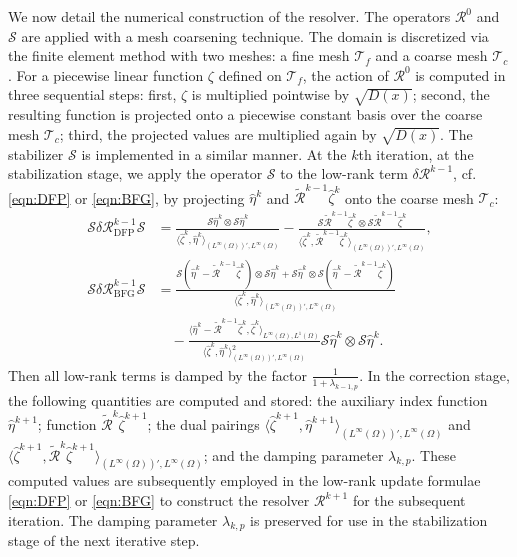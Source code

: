 \documentclass[onefignum,onetabnum]{siamart190516}
\numberwithin{equation}{section}
\begin{document}
We now detail the numerical construction of the resolver.
The operators $\mathcal{R}^0$ and $\mathcal{S}$ are applied with a mesh coarsening technique.
The domain is discretized via the finite element method with two meshes: a fine mesh $\mathscr{T}_f$ and a coarse mesh $\mathscr{T}_c$.
For a piecewise linear function $\zeta$ defined on $\mathscr{T}_f$, the action of $\mathcal{R}^0$ is computed in three sequential steps: first, $\zeta$ is multiplied pointwise by $\sqrt{D(x)}$; second, the resulting function is projected onto a piecewise constant basis over the coarse mesh $\mathscr{T}_c$; third, the projected values are multiplied again by $\sqrt{D(x)}$.
The stabilizer $\mathcal{S}$ is implemented in a similar manner.
At the $k$th iteration, at the stabilization stage, we apply the operator $\mathcal{S}$ to the low-rank term $\delta \mathcal{R}^{k-1}$, cf. \eqref{eqn:DFP} or \eqref{eqn:BFG}, by projecting $\hat{\eta}^{k}$ and $\widetilde{\mathcal{R}}^{k-1}\hat{\zeta}^{k}$ onto the coarse mesh $\mathscr{T}_{c}$:
\begin{equation*}
\begin{aligned}
\mathcal{S}\delta\mathcal{R}^{k-1}_{\mathrm{DFP}}\mathcal{S} &= \frac{\mathcal{S}\hat{\eta}^{k} \otimes \mathcal{S}\hat{\eta}^{k}}{\langle \hat{\zeta}^{k}, \hat{\eta}^{k} \rangle_{(L^{\infty}(\Omega))', L^{\infty}(\Omega)}} - \frac{\mathcal{S}\widetilde{\mathcal{R}}^{k-1} \hat{\zeta}^{k} \otimes \mathcal{S}\widetilde{\mathcal{R}}^{k-1} \hat{\zeta}^{k}}{\langle \hat{\zeta}^{k}, \widetilde{\mathcal{R}}^{k-1} \hat{\zeta}^{k} \rangle_{(L^{\infty}(\Omega))', L^{\infty}(\Omega)}}, \\
\mathcal{S}\delta\mathcal{R}_{\mathrm{BFG}}^{k-1}\mathcal{S} &= \frac{\mathcal{S}(\hat{\eta}^{k} - \widetilde{\mathcal{R}}^{k-1} \hat{\zeta}^{k}) \otimes \mathcal{S}\hat{\eta}^{k} + \mathcal{S}\hat{\eta}^{k} \otimes \mathcal{S}(\hat{\eta}^{k} - \widetilde{\mathcal{R}}^{k-1} \hat{\zeta}^{k})}{\langle \hat{\zeta}^{k}, \hat{\eta}^{k} \rangle_{(L^{\infty}(\Omega))', L^{\infty}(\Omega)}} \\
&\quad - \frac{\langle \hat{\eta}^{k} - \widetilde{\mathcal{R}}^{k-1} \hat{\zeta}^{k}, \hat{\zeta}^{k} \rangle_{L^{\infty}(\Omega), L^{1}(\Omega)}}{\langle \hat{\zeta}^{k}, \hat{\eta}^{k} \rangle_{(L^{\infty}(\Omega))', L^{\infty}(\Omega)}^{2}} \mathcal{S}\hat{\eta}^{k} \otimes \mathcal{S}\hat{\eta}^{k}.
\end{aligned}
\end{equation*}
Then all low-rank terms is damped by the factor $\frac{1}{1+\lambda_{k-1,p}}$.
In the correction stage, the following quantities are computed and stored: the auxiliary index function $\hat{\eta}^{k+1}$; function $\widetilde{\mathcal{R}}^{k}\hat{\zeta}^{k+1}$; the dual pairings $\langle \hat{\zeta}^{k+1},\hat{\eta}^{k+1}\rangle_{(L^{\infty}(\Omega))',L^{\infty}(\Omega)}$ and $\langle \hat{\zeta}^{k+1},\widetilde{\mathcal{R}}^{k}\hat{\zeta}^{k+1}\rangle_{(L^{\infty}(\Omega))',L^{\infty}(\Omega)}$; and the damping parameter $\lambda_{k,p}$.
These computed values are subsequently employed in the low-rank update formulae \eqref{eqn:DFP} or \eqref{eqn:BFG} to construct the resolver $\mathcal{R}^{k+1}$ for the subsequent iteration.
The damping parameter $\lambda_{k,p}$ is preserved for use in the stabilization stage of the next iterative step.
\end{document}
